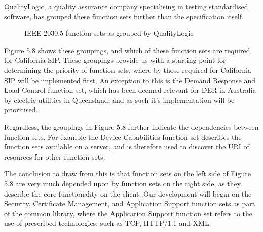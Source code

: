 QualityLogic, a quality assurance company specialising in testing standardised software, has grouped these function sets further than the specification itself.

\begin{figure}[H]
    \begin{center}
    \end{center}
    \caption{IEEE 2030.5 function sets as grouped by QualityLogic \cite[]{20305workshop}}
\end{figure}

Figure 5.8 shows these groupings, and which of these function sets are required for California SIP.
These groupings provide us with a starting point for determining the priority of function sets, where by those required for California SIP will be implemented first.
An exception to this is the Demand Response and Load Control function set, which has been deemed relevant for DER in Australia by electric utilities in Queensland, and as such it's implementation will be prioritised. \cite[]{QueenslandDER}

Regardless, the groupings in Figure 5.8 further indicate the dependencies between function sets. For example the Device Capabilities function set describes the function sets available on a server, and is therefore used to discover the URI of resources for other function sets.

The conclusion to draw from this is that function sets on the left side of Figure 5.8 are very much depended upon by function sets on the right side, as they describe the core functionality on the client.
Our development will begin on the Security, Certificate Management, and Application Support function sets as part of the common library, where the Application Support function set refers to the use of prescribed technologies, such as TCP, HTTP/1.1 and XML.


